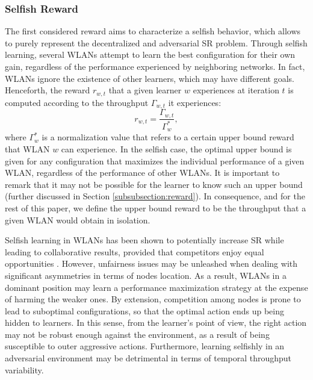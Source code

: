\documentclass{article}
\begin{document}
\subsubsection{Selfish Reward}
\label{subsubsection:selfish_learning}
The first considered reward aims to characterize a selfish behavior, which allows to purely represent the decentralized and adversarial SR problem. Through selfish learning, several WLANs attempt to learn the best configuration for their own gain, regardless of the performance experienced by neighboring networks. In fact, WLANs ignore the existence of other learners, which may have different goals. Henceforth, the reward $r_{w,t}$ that a given learner $w$ experiences at iteration $t$ is computed according to the throughput $\Gamma_{w,t}$ it experiences: 
\begin{equation}
r_{w,t} = \frac{\Gamma_{w,t}}{\Gamma_w^*}, 
\nonumber
\end{equation}		
where $\Gamma_w^*$ is a normalization value that refers to a certain upper bound reward that WLAN $w$ can experience. In the selfish case, the optimal upper bound is given for any configuration that maximizes the individual performance of a given WLAN, regardless of the performance of other WLANs. It is important to remark that it may not be possible for the learner to know such an upper bound (further discussed in Section \ref{subsubsection:reward}). In consequence, and for the rest of this paper, we define the upper bound reward to be the throughput that a given WLAN would obtain in isolation.

Selfish learning in WLANs has been shown to potentially increase SR while leading to collaborative results, provided that competitors enjoy equal opportunities \cite{wilhelmi2017collaborative}. However, unfairness issues may be unleashed when dealing with significant asymmetries in terms of nodes location. As a result, WLANs in a dominant position may learn a performance maximization strategy at the expense of harming the weaker ones. By extension, competition among nodes is prone to lead to suboptimal configurations, so that the optimal action ends up being hidden to learners. In this sense, from the learner's point of view, the right action may not be robust enough against the environment, as a result of being susceptible to outer aggressive actions. Furthermore, learning selfishly in an adversarial environment may be detrimental in terms of temporal throughput variability. 

\end{document}
